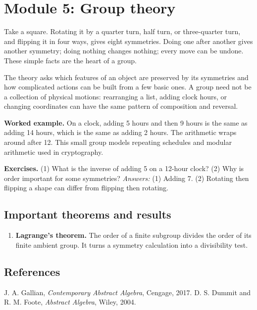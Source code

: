 \documentclass[11pt,oneside]{book}
\makeatletter
\renewenvironment{thebibliography}[1]
  {\list{\@biblabel{\@arabic\c@enumiv}}%
    {\settowidth\labelwidth{\@biblabel{#1}}%
     \leftmargin\labelwidth
     \advance\leftmargin\labelsep
     \usecounter{enumiv}%
     \let\p@enumiv\@empty
     \renewcommand\theenumiv{\@arabic\c@enumiv}}}
  {\endlist}
\makeatother
\begin{document}
\chapter[Module 5: Group theory]{Module 5: Group theory}
Take a square. Rotating it by a quarter turn, half turn, or three-quarter turn, and flipping it in four ways, gives eight symmetries. Doing one after another gives another symmetry; doing nothing changes nothing; every move can be undone. These simple facts are the heart of a group.

The theory asks which features of an object are preserved by its symmetries and how complicated actions can be built from a few basic ones. A group need not be a collection of physical motions: rearranging a list, adding clock hours, or changing coordinates can have the same pattern of composition and reversal.

\textbf{Worked example.} On a clock, adding 5 hours and then 9 hours is the same as adding 14 hours, which is the same as adding 2 hours. The arithmetic wraps around after 12. This small group models repeating schedules and modular arithmetic used in cryptography.

\textbf{Exercises.} (1) What is the inverse of adding 5 on a 12-hour clock? (2) Why is order important for some symmetries? \emph{Answers:} (1) Adding 7. (2) Rotating then flipping a shape can differ from flipping then rotating.

\section*{Important theorems and results}
\begin{enumerate}[leftmargin=*,itemsep=0.35em]
\item \textbf{Lagrange's theorem.} The order of a finite subgroup divides the order of its finite ambient group. It turns a symmetry calculation into a divisibility test.
\end{enumerate}

\section*{References}
\begin{thebibliography}{9}
 J. A. Gallian, \emph{Contemporary Abstract Algebra}, Cengage, 2017.
 D. S. Dummit and R. M. Foote, \emph{Abstract Algebra}, Wiley, 2004.
\end{thebibliography}
\end{document}
